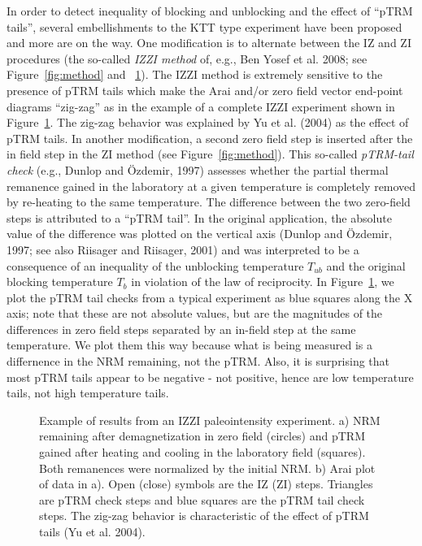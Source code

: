 In order to detect inequality of blocking and unblocking and the effect of  ``pTRM tails'',  several embellishments to the KTT type experiment have been proposed and more are on the way.  One modification is to alternate between the IZ and ZI procedures (the so-called 
{\it IZZI method}  of, e.g., 
Ben Yosef et al. 2008;   \nocite{benyosef08} see Figure~\ref{fig:method} and ~\ref{fig:zigzag}).  
The IZZI  method is extremely sensitive to the presence of  pTRM tails which make the Arai and/or zero field vector end-point diagrams 	``zig-zag'' as in the  example of a complete IZZI experiment shown in Figure~\ref{fig:zigzag}.    The zig-zag behavior was explained by 
Yu et al. (2004) as the effect of  pTRM tails.  \nocite{yu04}
In another  modification, a second zero field step is inserted after the in field step in the ZI method (see Figure~\ref{fig:method}).  This so-called 
{\it pTRM-tail check} 
\nocite{dunlop97} (e.g., Dunlop and \"Ozdemir, 1997) assesses whether the  partial thermal remanence gained in the laboratory at a given temperature is completely removed by re-heating to the same temperature.  The difference between the two zero-field steps is attributed to  a ``pTRM tail''.    In the original application, the absolute value of the difference was plotted on the vertical axis 
(Dunlop and \"Ozdemir, 1997; see also
 Riisager and Riisager, 2001) \nocite{riisager01} and was interpreted to be   a consequence of an inequality of the unblocking temperature $T_{ub}$ and the original blocking temperature $T_b$ in violation of the law of reciprocity.    In Figure~\ref{fig:zigzag}, we plot the  pTRM tail checks from a typical experiment as blue squares along the X axis;  note that these are not absolute values, but are the magnitudes of the differences in zero field steps separated by an in-field step at the same temperature.  We plot them this way because what is being measured is a differnence in the NRM remaining, not the pTRM.  Also, it is surprising that most pTRM tails appear to be negative - not positive, hence are low temperature tails, not high temperature tails. 

 

\begin{figure}[h!tb]
\epsfxsize 15cm
\centering {}
\caption{Example of results from an IZZI paleointensity experiment.  a) NRM remaining after demagnetization in zero field (circles) and pTRM gained after heating and cooling  in the laboratory field (squares).  Both remanences were normalized by the initial NRM.   b) Arai plot of data in  a).   Open (close) symbols are the IZ (ZI) steps.  Triangles are pTRM check steps and blue squares are the pTRM tail check steps.    The zig-zag behavior is characteristic of the effect of pTRM tails (Yu et al. 2004). }
\label{fig:zigzag}
\end{figure}



